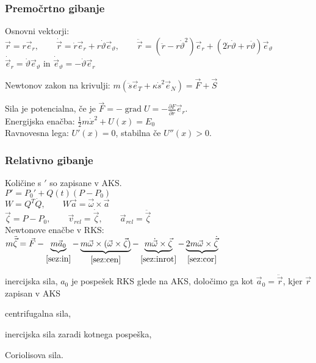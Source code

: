 \documentclass[a4paper,10pt]{article}
\title{\mytitle}
\author{Jure Slak}
\date{\today}
\theoremstyle{definition}
\newenvironment{enumerate*}%
{
\vspace{-6pt}
\begin{enumerate}[(1)]
\setlength{\itemsep}{0pt}
\setlength{\parskip}{2pt}
}
{\end{enumerate}}
\DeclareMathOperator{\grad}{grad}
\let\theta\vartheta
\newcommand{\vzeta}{\vec{\zeta}}
\newcommand{\dzeta}{\dot{\vzeta}}
\newcommand{\ddzeta}{\ddot{\vzeta}}
\newcommand{\vomega}{\vec{\omega}}
\newcommand{\domega}{\dot{\vomega}}
\newcommand{\va}{\vec{a}}
\newcommand{\vr}{\vec{r}}
\newcommand{\dr}{\dot{\vr}}
\newcommand{\ddr}{\ddot{\vr}}
\newcommand{\er}{\vec{e}_r}
\newcommand{\eq}{\vec{e}_{\theta}}
\begin{document}
\subsubsection*{Premočrtno gibanje}
Osnovni vektorji: $\vr = r\er, \qquad \dr = \dot{r}\er + r\dot{\theta}\eq,
\qquad \ddr = (\ddot{r} - r\dot{\theta}^2)\er + (2\dot{r}\dot{\theta} +
r\ddot{\theta})\eq$ \\
$\dot{\vec{e}}_r = \dot{\theta} \eq$ in $\dot{\vec{e}}_{\theta} = - \dot{\theta} \er$

Newtonov zakon na krivulji: $m(\ddot{s}\vec{e}_T + \kappa\dot{s}^2\vec{e}_N)
= \vec{F} + \vec{S}$

Sila je potencialna, če je $\vec{F} = -\grad U = - \frac{\partial F}{\partial
r}\er$. \\
Energijska enačba: $\frac12m\dot{x}^2 + U(x) = E_0$ \\
Ravnovesna lega: $U'(x) = 0$, stabilna če $U''(x) > 0$.

\subsubsection*{Relativno gibanje}
Količine s $'$ so zapisane v AKS. \\
$P' = P_0' + Q(t)(P-P_0)$ \\
$W = Q^T\dot{Q}, \qquad  W\va = \vomega \times \va$ \\
$\vzeta = P - P_0, \qquad \vec{v}_{rel} = \dzeta, \qquad \va_{rel} =
\ddzeta$
\\
Newtonove enačbe v RKS: \\[6pt]
$m\ddzeta = \vec{F} -
\underbrace{m\va_0}_{\eqref{sez:in}} -
\underbrace{m\vomega \times (\vomega \times \vzeta)}_{\eqref{sez:cen}} -
\underbrace{m\domega\times\vzeta}_{\eqref{sez:inrot}} -
\underbrace{2m\vomega\times\dzeta}_{\eqref{sez:cor}}$

\begin{enumerate*}
  \item inercijska sila, $a_0$ je pospešek RKS glede na AKS,  določimo ga kot
      $\vec{a}_0 = \ddot{\vec{r}}$, kjer $\vec{r}$ zapisan v AKS \label{sez:in}
  \item centrifugalna sila,                                   \label{sez:cen}
  \item inercijska sila zaradi kotnega pospeška,              \label{sez:inrot}
  \item Coriolisova sila.                                     \label{sez:cor}
\end{enumerate*}
\end{document}

